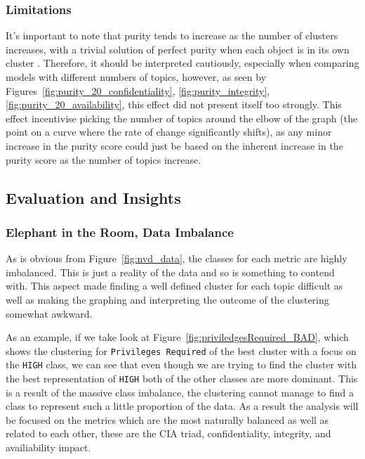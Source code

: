 \documentclass[12pt]{article}
\begin{document}
\subsubsection{Limitations}

It's important to note that purity tends to increase as the number of clusters increases, with a
trivial solution of perfect purity when each object is in its own cluster \cite{v-measure}.
Therefore, it should be interpreted cautiously, especially when comparing models with different
numbers of topics, however, as seen by Figures~\ref{fig:purity_20_confidentiality}, \ref{fig:purity_integrity},
\ref{fig:purity_20_availability}, this effect did not present
itself too strongly. This effect incentivise picking the number of topics around the elbow of the
graph (the point on a curve where the rate of change significantly shifts), as any minor increase in
the purity score could just be based on the inherent increase in the purity score as the number of
topics increase.





\subsection{Evaluation and Insights}

\subsubsection{Elephant in the Room, Data Imbalance}

As is obvious from Figure~\ref{fig:nvd_data}, the classes for each metric are highly imbalanced.
This is just a reality of the data and so is something to contend with. This aspect
made finding a well defined cluster for each topic difficult as well as making the graphing and
interpreting the outcome of the clustering somewhat awkward.

As an example, if we take look at Figure~\ref{fig:priviledgesRequired_BAD}, which shows the
clustering for \texttt{Privileges Required}  of the best cluster with a focus on the \texttt{HIGH} class, we
can see that even though we are trying to find the cluster with the best representation of
\texttt{HIGH} both of the other classes are more dominant. This is a result of the massive class
imbalance, the clustering cannot manage to find a class to represent such a little proportion of the
data. As a result the analysis will be focused on the metrics which are the most naturally balanced
as well as related to each other, these are the CIA triad, confidentiality, integrity, and availiability
impact.
\end{document}
